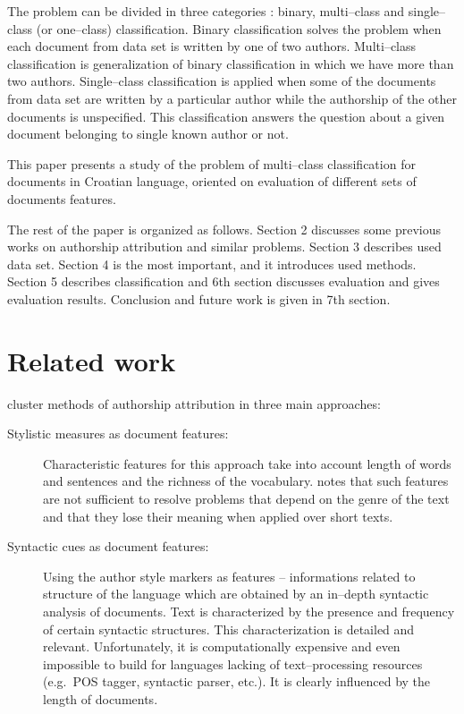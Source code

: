 \documentclass[11pt,english]{article}
\begin{document}
\begin{multicols}{2}
The problem can be divided in three categories \citep{zhao2005effective}: binary,
multi--class and single--class (or one--class) classification. Binary
classification solves the problem when each document from data set is written by
one of two authors. Multi--class classification is generalization of binary
classification in which we have more than two authors. Single--class
classification is applied when some of the documents from data set are written by
a particular author while the authorship of the other documents is unspecified.
This classification answers the question about a given document belonging to
single known author or not.

This paper presents a study of the problem of multi--class classification for
documents in Croatian language, oriented on evaluation of different sets of
documents features.

The rest of the paper is organized as follows. Section 2 discusses some previous
works on authorship attribution and similar problems. Section 3 describes used
data set. Section 4 is the most important, and it introduces used methods.
Section 5 describes classification and 6th section discusses evaluation and
gives evaluation results. Conclusion and future work is given in 7th section.

\section{Related work}
\citet{coyotl2006authorship} cluster methods of authorship attribution in three
main approaches:
\begin{description}
\item[Stylistic measures as document features:] Characteristic features for this
approach take into account length of words and sentences and the richness of the
vocabulary. \citet{coyotl2006authorship} notes that such features are not
sufficient to resolve problems that depend on the genre of the text and that they
lose their meaning when applied over short texts.

\item[Syntactic cues as document features:] Using the author style markers as
features -- informations related to structure of the language which are obtained
by an in--depth syntactic analysis of documents. Text is characterized by the
presence and frequency of certain syntactic structures. This characterization is
detailed and relevant. Unfortunately, it is computationally expensive and even
impossible to build for languages lacking of text--processing resources (e.g.\
POS tagger, syntactic parser, etc.). It is clearly influenced by the length of
documents.


\end{description}
\end{multicols}
\end{document}
